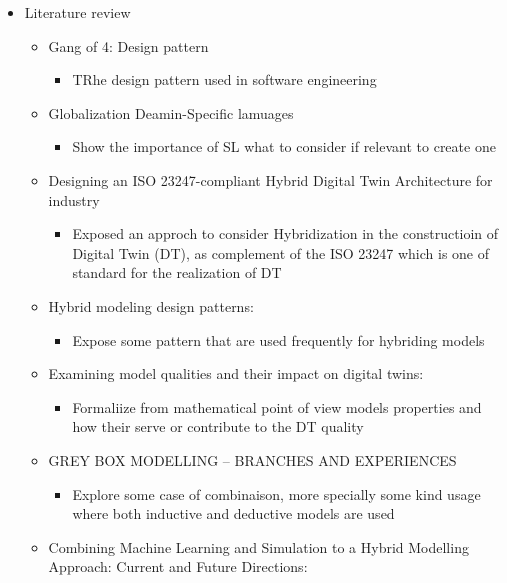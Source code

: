 \documentclass[
]{article}
\providecommand{\tightlist}{%
  \setlength{\itemsep}{0pt}\setlength{\parskip}{0pt}}
\begin{document}
\begin{itemize}
\item
  Literature review

  \begin{itemize}
  \tightlist
  \item
    Gang of 4: Design pattern

    \begin{itemize}
    \tightlist
    \item
      TRhe design pattern used in software engineering
    \end{itemize}
  \item
    Globalization Deamin-Specific lamuages

    \begin{itemize}
    \tightlist
    \item
      Show the importance of SL what to consider if relevant to create
      one
    \end{itemize}
  \item
    Designing an ISO 23247-compliant Hybrid Digital Twin Architecture
    for industry

    \begin{itemize}
    \tightlist
    \item
      Exposed an approch to consider Hybridization in the constructioin
      of Digital Twin (DT), as complement of the ISO 23247 which is one
      of standard for the realization of DT
    \end{itemize}
  \item
    Hybrid modeling design patterns:

    \begin{itemize}
    \tightlist
    \item
      Expose some pattern that are used frequently for hybriding models
    \end{itemize}
  \item
    Examining model qualities and their impact on digital twins:

    \begin{itemize}
    \tightlist
    \item
      Formaliize from mathematical point of view models properties and
      how their serve or contribute to the DT quality
    \end{itemize}
  \item
    GREY BOX MODELLING -- BRANCHES AND EXPERIENCES

    \begin{itemize}
    \tightlist
    \item
      Explore some case of combinaison, more specially some kind usage
      where both inductive and deductive models are used
    \end{itemize}
  \item
    Combining Machine Learning and Simulation to a Hybrid Modelling
    Approach: Current and Future Directions:


\end{itemize}
\end{itemize}
\end{document}
